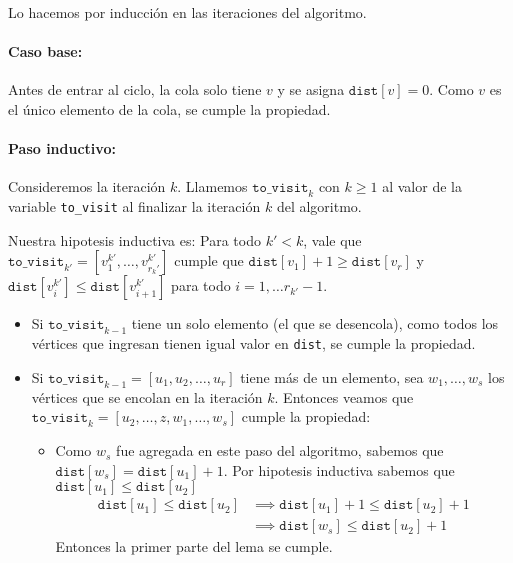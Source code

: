 \begin{demo}
  Lo hacemos por inducción en las iteraciones del algoritmo.
  \paragraph{Caso base:} Antes de entrar al ciclo, la cola solo tiene \(v\) y se asigna \(\texttt{dist}[v] = 0 \). Como \(v\) es el único elemento de la cola, se cumple la propiedad.


  \paragraph{Paso inductivo:} Consideremos la iteración \(k\). Llamemos \(\texttt{to\_visit}_k\) con \(k \geq 1\) al valor de la variable \texttt{to\_visit} al finalizar la iteración \(k\) del algoritmo.

  Nuestra hipotesis inductiva es: Para todo \(k' < k\), vale que \(\texttt{to\_visit}_{k'} = [v_1^{k'},\dots,v_{r_k'}^{k'}]\) cumple que  \(\texttt{dist}[v_1] + 1 \geq \texttt{dist}[v_r]\) y
  \(\texttt{dist}[v^{k'}_i] \leq \texttt{dist}[v^{k'}_{i+1}]\) para todo \(i = 1,\dots r_{k'}-1\).
  \begin{itemize}
    \item Si \(\texttt{to\_visit}_{k-1}\) tiene un solo elemento (el que se desencola), como todos los vértices que ingresan tienen igual valor en \texttt{dist}, se cumple la propiedad.
    \item Si \(\texttt{to\_visit}_{k-1} = [u_1,u_2,\dots,u_r]\) tiene más de un elemento, sea \(w_1,\dots,w_s\) los vértices que se encolan en la iteración \(k\).
          Entonces veamos que \(\texttt{to\_visit}_k = [u_2,\dots,z,w_1,\dots,w_s]\) cumple la propiedad:
          \begin{itemize}
            \item Como \(w_s\) fue agregada en este paso del algoritmo, sabemos que \(\texttt{dist}[w_s] = \texttt{dist}[u_1] + 1\). Por hipotesis inductiva sabemos que \(\texttt{dist}[u_1] \leq \texttt{dist}[u_2]\)
                  \begin{align*}
                    \texttt{dist}[u_1] \leq \texttt{dist}[u_2] & \implies \texttt{dist}[u_1] + 1\leq \texttt{dist}[u_2] + 1 \\ & \implies \texttt{dist}[w_s] \leq \texttt{dist}[u_2] + 1
                  \end{align*}
                  Entonces la primer parte del lema se cumple.
          \end{itemize}
  \end{itemize}
\end{demo}
